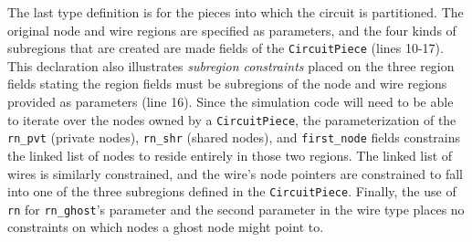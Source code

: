 The last type definition is for the pieces into which the circuit is partitioned.
The original node and wire regions are specified as parameters, and the
four kinds of subregions that are created are made fields of the
{\tt CircuitPiece} (lines 10-17).  This declaration also illustrates {\em subregion constraints}
placed on the three region fields stating the region fields must be subregions of the 
node and wire regions provided as parameters (line 16).  Since the simulation code will need to be able to
iterate over the nodes owned by a {\tt CircuitPiece}, the parameterization of the {\tt rn\_pvt} (private nodes),
{\tt rn\_shr} (shared nodes), and {\tt first\_node} fields constrains the linked list of
nodes to reside entirely in those two regions.  The linked list of wires is
similarly constrained, and the wire's node pointers are constrained to fall
into one of the three subregions defined in the {\tt CircuitPiece}.  Finally,
the use of {\tt rn} for {\tt rn\_ghost}'s parameter and the second parameter
in the wire type places no constraints on which nodes a ghost node might point
to.


%

%
%

